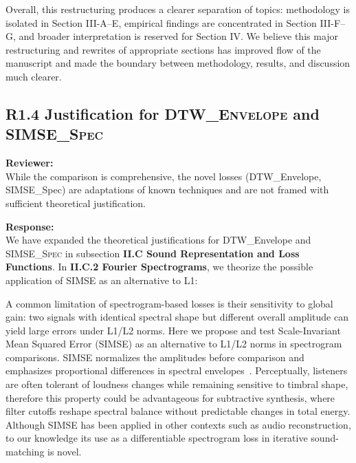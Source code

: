 \documentclass[11pt]{article}
\newcommand{\DTWEnv}{\textsc{DTW\_Envelope}}
\newcommand{\SIMSESpec}{\textsc{SIMSE\_Spec}}
\begin{document}
Overall, this restructuring produces a clearer separation of topics: methodology is isolated in Section III-A–E, empirical findings are concentrated in Section III-F–G, and broader interpretation is reserved for Section IV. We believe this major restructuring and rewrites of appropriate sections has improved flow of the manuscript and made the boundary between methodology, results, and discussion much clearer.

\subsection*{R1.4 Justification for \DTWEnv{} and \SIMSESpec}
\label{R1.4}
\noindent\textbf{Reviewer:} \\
\noindent While the comparison is comprehensive, the novel losses (DTW\_Envelope, SIMSE\_Spec) are adaptations of known techniques and are not framed with sufficient theoretical justification. 

\noindent\textbf{Response:} \\
We have expanded the theoretical justifications for DTW\_Envelope and \SIMSESpec{} in subsection \textbf{II.C Sound Representation and Loss Functions}. In \textbf{II.C.2 Fourier Spectrograms}, we theorize the possible application of SIMSE as an alternative to L1:
\begin{displayquote}
    A common limitation of spectrogram-based losses is their sensitivity to global gain: two signals with identical spectral shape but different overall amplitude can yield large errors under L1/L2 norms. 
    Here we propose and test Scale-Invariant Mean Squared Error (SIMSE) as an alternative to L1/L2 norms in spectrogram comparisons. SIMSE normalizes the amplitudes before comparison and emphasizes proportional differences in spectral envelopes~\cite{barron2014shapessimse}. 
    Perceptually, listeners are often tolerant of loudness changes while remaining sensitive to timbral shape, therefore this property could be advantageous for subtractive synthesis, where filter cutoffs reshape spectral balance without predictable changes in total energy. Although SIMSE has been applied in other contexts such as audio reconstruction, to our knowledge its use as a differentiable spectrogram loss in iterative sound-matching is novel.
\end{displayquote}
\end{document}
